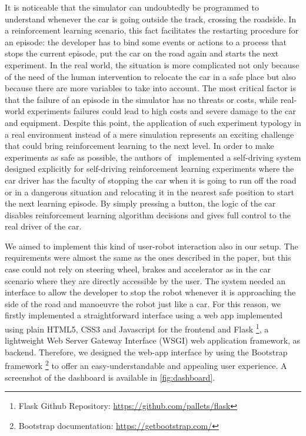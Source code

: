 It is noticeable that the simulator can undoubtedly be programmed to understand whenever the car is going outside the track, crossing the roadside.
In a reinforcement learning scenario, this fact facilitates the restarting procedure for an episode: the developer has to bind some events or actions to a process that stops the current episode, put the car on the road again and starts the next experiment.
In the real world, the situation is more complicated not only because of the need of the human intervention to relocate the car in a safe place but also because there are more variables to take into account.
The most critical factor is that the failure of an episode in the simulator has no threats or costs, while real-world experiments failures could lead to high costs and severe damage to the car and equipment.
Despite this point, the application of such experiment typology in a real environment instead of a mere simulation represents an exciting challenge that could bring reinforcement learning to the next level.
In order to make experiments as safe as possible, the authors of~\cite{kendall2018learning,kendall2019learning} implemented a self-driving system designed explicitly for self-driving reinforcement learning experiments where the car driver has the faculty of stopping the car when it is going to run off the road or in a dangerous situation and relocating it in the nearest safe position to start the next learning episode.
By simply pressing a button, the logic of the car disables reinforcement learning algorithm decisions and gives full control to the real driver of the car.

We aimed to implement this kind of user-robot interaction also in our setup.
The requirements were almost the same as the ones described in the paper, but this case could not rely on steering wheel, brakes and accelerator as in the car scenario where they are directly accessible by the user.
The system needed an interface to allow the developer to stop the robot whenever it is approaching the side of the road and manoeuvre the robot just like a car.
For this reason, we firstly implemented a straightforward interface using a web app implemented using plain HTML5, CSS3 and Javascript for the frontend and Flask \footnote{Flask Github Repository: \href{https://github.com/pallets/flask}{https://github.com/pallets/flask}}, a lightweight Web Server Gateway Interface (WSGI) web application framework, as backend.
Therefore, we designed the web-app interface by using the Bootstrap framework \footnote{Bootstrap documentation: \href{https://getbootstrap.com/}{https://getbootstrap.com/}} to offer an easy-understandable and appealing user experience.
A screenshot of the dashboard is available in \vref{fig:dashboard}.

